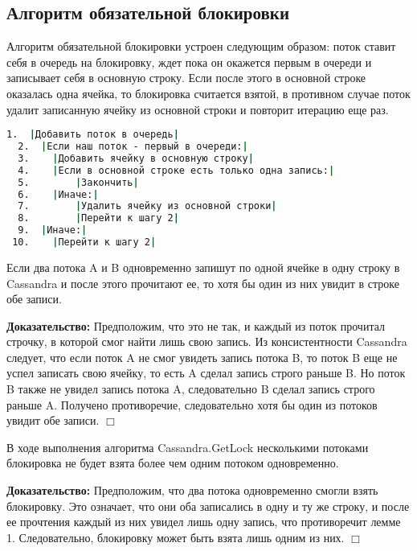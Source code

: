 \subsection{Алгоритм обязательной блокировки}

Алгоритм обязательной блокировки устроен следующим образом: поток ставит себя в очередь на блокировку, ждет пока он окажется первым в очереди и записывает себя в основную строку. Если после этого в основной строке оказалась одна ячейка, то блокировка считается взятой, в противном случае поток удалит записанную ячейку из основной строки и повторит итерацию еще раз.

\begin{lstlisting}[language=csh,caption={Алгоритм Cassandra.GetLock(lockId, threadId)}]
  1.  |Добавить поток в очередь|
  2.  |Если наш поток - первый в очереди:|
  3.  	|Добавить ячейку в основную строку|
  4.  	|Если в основной строке есть только одна запись:|
  5.  		|Закончить|
  6.  	|Иначе:|
  7.  		|Удалить ячейку из основной строки|
  8.  		|Перейти к шагу 2|
  9.  |Иначе:|
 10.  	|Перейти к шагу 2|

\end{lstlisting}

\begin{lemma}
Если два потока A и B одновременно запишут по одной ячейке в одну строку в Cassandra и после этого прочитают ее, то хотя бы один из них увидит в строке обе записи.
\end{lemma}
\textbf{Доказательство:}
Предположим, что это не так, и каждый из поток прочитал строчку, в которой смог найти лишь свою запись. Из консистентности Cassandra следует, что если поток A не смог увидеть запись потока B, то поток B еще не успел записать свою ячейку, то есть A сделал запись строго раньше B. Но поток B также не увидел запись потока A, следовательно B сделал запись строго раньше A. Получено противоречие, следовательно хотя бы один из потоков увидит обе записи.
$\Box$

\begin{theorem}
В ходе выполнения алгоритма Cassandra.GetLock несколькими потоками блокировка не будет взята более чем одним потоком одновременно.
\end{theorem}
\textbf{Доказательство:}
Предположим, что два потока одновременно смогли взять блокировку. Это означает, что они оба записались в одну и ту же строку, и после ее прочтения каждый из них увидел лишь одну запись, что противоречит лемме 1. Следовательно, блокировку может быть взята лишь одним из них.
$\Box$